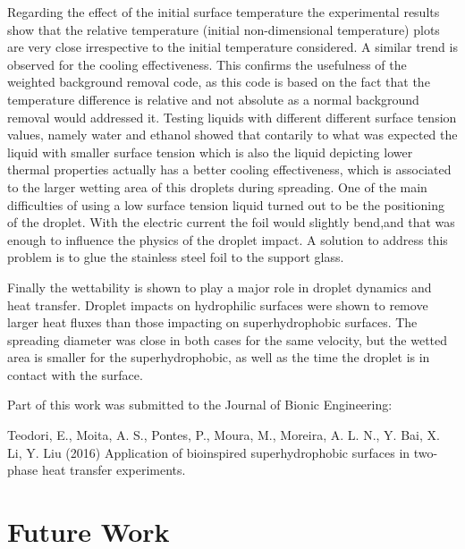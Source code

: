 \par Regarding the effect of the initial surface temperature the experimental results show  that the relative temperature (initial non-dimensional temperature) plots are very close irrespective to the initial temperature considered. A similar trend is observed for the cooling effectiveness. This confirms the usefulness of the weighted background removal code, as this code is based on the fact that the temperature difference is relative and not absolute as a normal background removal would addressed it. Testing liquids with different different surface tension values, namely water and ethanol showed that contarily to what was expected the liquid with smaller surface tension which is also the liquid depicting lower thermal properties actually has a better cooling effectiveness, which is associated to the larger wetting area of this droplets during spreading. One of the main difficulties of using a low surface tension liquid turned out to be the positioning of the droplet. With the electric current the foil would slightly bend,and that was enough to influence the physics of the droplet impact. A solution to address this problem is to glue the stainless steel foil to the support glass.\\
\par Finally the wettability is shown to play a major role in droplet dynamics and heat transfer. Droplet impacts on hydrophilic surfaces were shown to remove larger heat fluxes than those impacting on superhydrophobic surfaces. The spreading diameter was close in both cases for the same velocity, but the wetted area is smaller for the superhydrophobic, as well as the time the droplet is in contact with the surface.\\
\par Part of this work was submitted to the Journal of Bionic Engineering:
 
\noindent Teodori, E., Moita, A. S., Pontes, P., Moura, M., Moreira, A. L. N., Y. Bai, X. Li, Y. Liu (2016) Application of bioinspired superhydrophobic surfaces in two-phase heat transfer experiments.

\section{Future Work}

